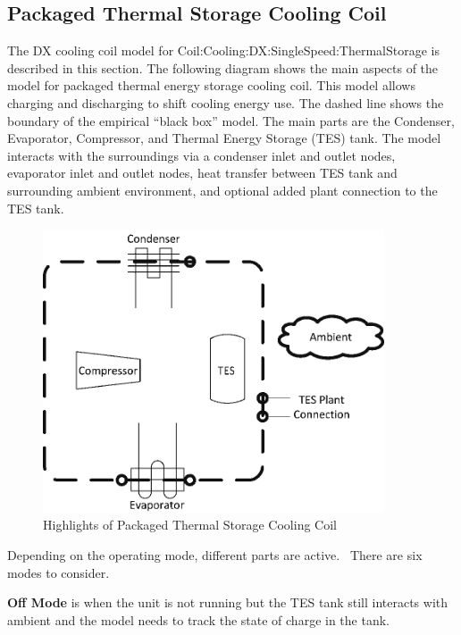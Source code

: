 \subsection{Packaged Thermal Storage Cooling Coil}\label{packaged-thermal-storage-cooling-coil}

The DX cooling coil model for Coil:Cooling:DX:SingleSpeed:ThermalStorage is described in this section. The following diagram shows the main aspects of the model for packaged thermal energy storage cooling coil. This model allows charging and discharging to shift cooling energy use. The dashed line shows the boundary of the empirical ``black box'' model. The main parts are the Condenser, Evaporator, Compressor, and Thermal Energy Storage (TES) tank. The model interacts with the surroundings via a condenser inlet and outlet nodes, evaporator inlet and outlet nodes, heat transfer between TES tank and surrounding ambient environment, and optional added plant connection to the TES tank.

\begin{figure}[hbtp] %
\centering
\includegraphics[width=0.9\textwidth, height=0.9\textheight, keepaspectratio=true]{media/image4287.png}
\caption{Highlights of Packaged Thermal Storage Cooling Coil \protect \label{fig:highlights-of-packaged-thermal-storage}}
\end{figure}

Depending on the operating mode, different parts are active.~ There are six modes to consider.

\textbf{Off Mode} is when the unit is not running but the TES tank still interacts with ambient and the model needs to track the state of charge in the tank.

